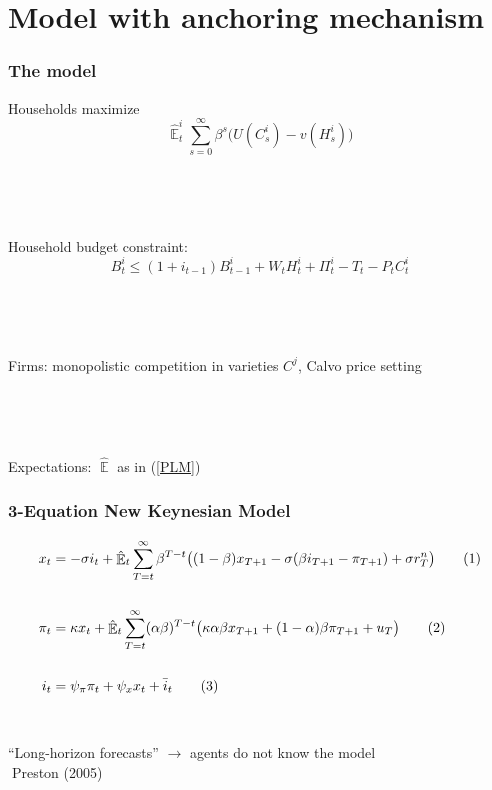 \documentclass{beamer}
\DeclareMathOperator{\E}{\mathbb{E}}
\newcommand\numberthis{\addtocounter{equation}{1}\tag{\theequation}} %
\begin{document}
\section{Model with anchoring mechanism}

\begin{frame}
	\frametitle{The model}

Households maximize
\begin{equation}
\hat{\E}^i_t \sum_{s=0}^{\infty} \beta^s \bigg( U(C^i_s) - v(H^i_s)\bigg)
\end{equation}

\

\

Household budget constraint:
\begin{equation}
 B^i_t \leq (1+i_{t-1})B^i_{t-1} + W_tH^i_t + \Pi_t^i -T_t -P_tC^i_t
\end{equation}


\

\

Firms: monopolistic competition in varieties $C^j$, Calvo price setting

\

\

Expectations: $\hat{\E}$ as in (\ref{PLM})

\end{frame}

\begin{frame}
	\frametitle{3-Equation New Keynesian Model}
	\label{NK}

\begin{align*}
x_t &=  -\sigma i_t +\hat{\E}_t \sum_{T=t}^{\infty} \beta^{T-t }\big( (1-\beta)x_{T+1} - \sigma(\beta i_{T+1} - \pi_{T+1}) +\sigma r_T^n \big) \label{prestons18}  \numberthis \\
\\
\pi_t &= \kappa x_t +\hat{\E}_t \sum_{T=t}^{\infty} (\alpha\beta)^{T-t }\big( \kappa \alpha \beta x_{T+1} + (1-\alpha)\beta \pi_{T+1} + u_T\big) \label{prestons19}  \numberthis \\
\\
i_t &= \psi_{\pi}\pi_t + \psi_{x} x_t + \bar{i}_t \label{TR} \numberthis
\end{align*}

\

``Long-horizon forecasts'' $\rightarrow$ agents do not know the model\\
$\; $Preston (2005)

\

\hyperlink{derivations}{} \\
\hyperlink{compact}{}	


\end{frame}
\end{document}

